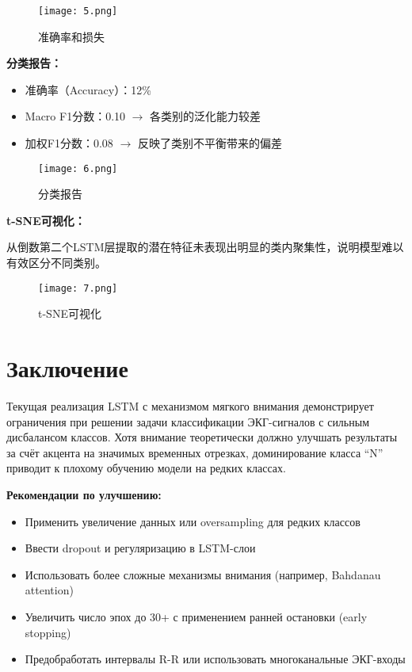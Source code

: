 \documentclass{article}
\providecommand{\pcsync}{\par\vspace{\baselineskip}}
\begin{document}
\begin{paracol}{2}
\begin{figure}[H]
    \centering
    \texttt{[image: 5.png]}
    \caption{准确率和损失}
    \label{fig:enter-label}
\end{figure}

\textbf{分类报告：}
\begin{itemize}
    \item 准确率（Accuracy）：12\%
    \item Macro F1分数：0.10 $\rightarrow$ 各类别的泛化能力较差
    \item 加权F1分数：0.08 $\rightarrow$ 反映了类别不平衡带来的偏差
\end{itemize}

\begin{figure}[H]
    \centering
    \texttt{[image: 6.png]}
    \caption{分类报告}
    \label{fig:enter-label}
\end{figure}

\textbf{t-SNE可视化：}

从倒数第二个LSTM层提取的潜在特征未表现出明显的类内聚集性，说明模型难以有效区分不同类别。

\begin{figure}[H]
    \centering
    \texttt{[image: 7.png]}
    \caption{t-SNE可视化}
    \label{fig:enter-label}
\end{figure}

\switchcolumn*



\section{Заключение}
\pcsync
Текущая реализация LSTM с механизмом мягкого внимания демонстрирует ограничения при решении задачи классификации ЭКГ-сигналов с сильным дисбалансом классов. Хотя внимание теоретически должно улучшать результаты за счёт акцента на значимых временных отрезках, доминирование класса ``N'' приводит к плохому обучению модели на редких классах.

\textbf{Рекомендации по улучшению:}
\begin{itemize}
    \item Применить увеличение данных или oversampling для редких классов
    \item Ввести dropout и регуляризацию в LSTM-слои
    \item Использовать более сложные механизмы внимания (например, Bahdanau attention)
    \item Увеличить число эпох до 30+ с применением ранней остановки (early stopping)
    \item Предобработать интервалы R-R или использовать многоканальные ЭКГ-входы
\end{itemize}


\end{paracol}
\end{document}
